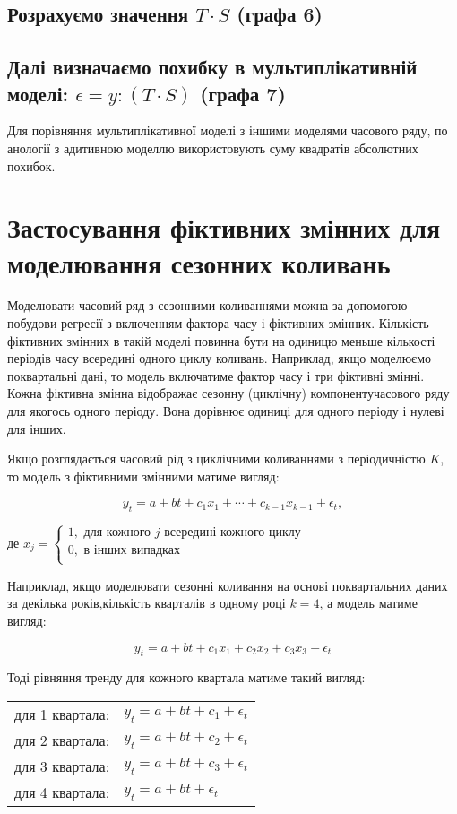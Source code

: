 \documentclass[a4paper, fontsize=10pt, oneside]{article}
\begin{document}
\section{\rm \normalsize Розрахуємо значення $T \cdot S$ (графа 6)}
\section{\rm \normalsize Далі визначаємо похибку в мультиплікативній моделі: $\epsilon = y : (T \cdot S)$ (графа 7)}
Для порівняння мультиплікативної моделі з іншими моделями часового ряду, по анології з адитивною моделлю використовують суму квадратів абсолютних похибок.

\chapter{\Large \bf Застосування фіктивних змінних для моделювання сезонних коливань}
Моделювати часовий ряд з сезонними коливаннями можна за допомогою побудови регресії з включенням фактора часу і фіктивних змінних. Кількість фіктивних змінних в такій моделі повинна бути на одиницю меньше кількості періодів часу всередині одного циклу коливань. Наприклад, якщо моделюємо поквартальні дані, то модель включатиме фактор часу і три фіктивні змінні. Кожна фіктивна змінна відображає сезонну (циклічну) компонентучасового ряду для якогось одного періоду. Вона дорівнює одиниці для одного періоду і нулеві для інших.

Якщо розглядається часовий рід з циклічними коливаннями з періодичністю $K$, то модель з фіктивними змінними матиме вигляд:

$$y_{t} = a +bt + c_{1}x_{1} + \cdots +c_{k-1}x_{k-1} + \epsilon_{t},$$

\noindent де $x_{j} = 
\left\{
  \begin{array}{l}
     1, \texttt{ для кожного } j \texttt{ всередині кожного циклу}\\
     0, \texttt{ в інших випадках} \\
  \end{array}
\right.$

Наприклад, якщо моделювати сезонні коливання на основі поквартальних даних за декілька років,кількість кварталів в одному році $k = 4$, а модель матиме вигляд: 

$$y_{t} = a + bt + c_{1}x_{1} + c_{2}x_{2} + c_{3}x_{3} + \epsilon_{t}$$

Тоді рівняння тренду для кожного квартала матиме такий вигляд:

\begin{tabular}{l l}
для 1 квартала: & $y_{t} = a + bt + c_{1} + \epsilon_{t}$\\
для 2 квартала: & $y_{t} = a + bt + c_{2} + \epsilon_{t}$\\
для 3 квартала: & $y_{t} = a + bt + c_{3} + \epsilon_{t}$\\
для 4 квартала: & $y_{t} = a + bt + \epsilon_{t}$\\
\end{tabular}
\end{document}
